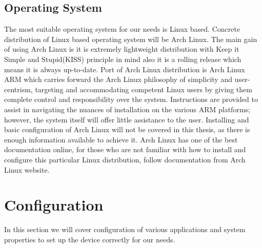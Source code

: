 \subsection{Operating System}
The most suitable operating system for our needs is Linux based. Concrete distribution of Linux based operating system will be Arch Linux. The main gain of using Arch Linux is it is extremely lightweight distribution with Keep it Simple and Stupid(KISS) principle in mind also it is a rolling release which means it is always up-to-date. Port of Arch Linux distribution is Arch Linux ARM which carries forward the Arch Linux philosophy of simplicity and user-centrism, targeting and accommodating competent Linux users by giving them complete control and responsibility over the system. Instructions are provided to assist in navigating the nuances of installation on the various ARM platforms; however, the system itself will offer little assistance to the user.
Installing and basic configuration of Arch Linux will not be covered in this thesis, as there is enough information available to achieve it. Arch Linux has one of the best documentation online, for those who are not familiar with how to install and configure this particular Linux distribution, follow documentation from Arch Linux website.

\newpage
\section{Configuration} %
\label{sec:configuration}
In this section we will cover configuration of various applications and system properties to set up the device correctly for our needs.
